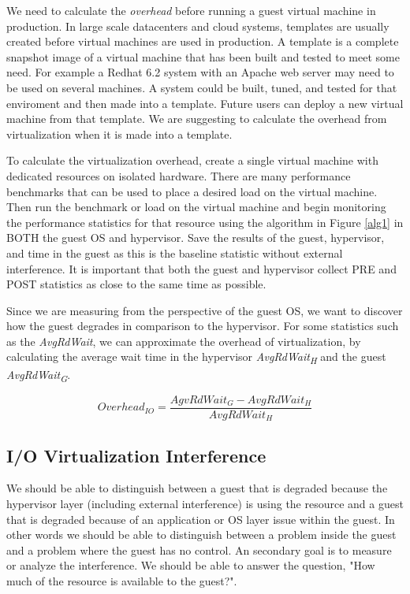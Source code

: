 We need to calculate the \emph{overhead} before running a guest virtual machine in production. 
In large scale datacenters and cloud systems, templates are usually created before virtual machines are used in production.  A template is a complete snapshot image of a virtual machine that has been built and tested to meet some need.  For example a Redhat 6.2 system with an Apache web server may need to be used on several machines.  A system could be built, tuned, and tested for that enviroment and then made into a template.  Future users can deploy a new virtual machine from that template.  We are suggesting to calculate the overhead from virtualization when it is made into a template.  

To calculate the virtualization overhead, create a single virtual machine with dedicated resources on isolated hardware.  
There are many performance benchmarks that can be used \cite{katcher, tikotekar, hplBench} to place a desired load on the virtual machine. 
Then run the benchmark or load on the virtual machine and begin monitoring the performance statistics for that resource using the algorithm in Figure \ref{alg1} in BOTH the guest OS and hypervisor. 
Save the results of the guest, hypervisor, and time in the guest as this is the baseline statistic without external interference.
It is important that both the guest and hypervisor collect PRE and POST statistics as close to the same time as possible.  

Since we are measuring from the perspective of the guest OS, we want to discover how the guest degrades in comparison to the hypervisor.  
For some statistics such as the \emph{AvgRdWait}, we can approximate the overhead of virtualization, by calculating the average wait time in the hypervisor \emph{AvgRdWait\textsubscript{H}} and the guest \emph{AvgRdWait\textsubscript{G}}.

\begin{equation}
  Overhead_{IO} = \frac{AgvRdWait_G - AvgRdWait_H}{AvgRdWait_H} 
\end{equation}

\subsection{I/O Virtualization Interference}
We should be able to distinguish between a guest that is degraded because the hypervisor layer (including external interference) is using the resource and a guest that is degraded because of an application or OS layer issue within the guest.  In other words we should be able to distinguish between a problem inside the guest and a problem where the guest has no control.  An secondary goal is to measure or analyze the interference.  We should be able to answer the question, "How much of the resource is available to the guest?".


